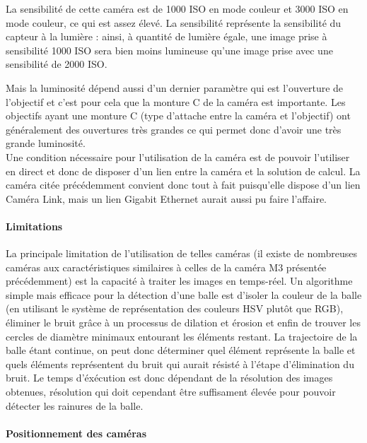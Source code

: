 La sensibilité de cette caméra est de 1000 ISO en mode couleur et 3000 ISO en mode couleur, ce qui est assez élevé. La sensibilité représente la sensibilité du capteur à la lumière : ainsi, à quantité de lumière égale, une image prise à sensibilité 1000 ISO sera bien moins lumineuse qu'une image prise avec une sensibilité de 2000 ISO. 

Mais la luminosité dépend aussi d'un dernier paramètre qui est l'ouverture de l'objectif et c'est pour cela que la monture C de la caméra est importante. Les objectifs ayant une monture C (type d'attache entre la caméra et l'objectif) ont généralement des ouvertures très grandes ce qui permet donc d'avoir une très grande luminosité. \\


Une condition nécessaire pour l'utilisation de la caméra est de pouvoir l'utiliser en direct et donc de disposer d'un lien entre la caméra et la solution de calcul. La caméra citée précédemment convient donc tout à fait puisqu'elle dispose d'un lien Caméra Link, mais un lien Gigabit Ethernet aurait aussi pu faire l'affaire.

\paragraph{Limitations\\}

La principale limitation de l'utilisation de telles caméras (il existe de nombreuses caméras aux caractéristiques similaires à celles de la caméra M3 présentée précédemment) est la capacité à traiter les images en temps-réel. Un algorithme simple mais efficace pour la détection d'une balle est d'isoler la couleur de la balle (en utilisant le système de représentation des couleurs HSV plutôt que RGB), éliminer le bruit grâce à un processus de dilation et érosion et enfin de trouver les cercles de diamètre minimaux entourant les éléments restant. La trajectoire de la balle étant continue, on peut donc déterminer quel élément représente la balle et quels éléments représentent du bruit qui aurait résisté à l'étape d'élimination du bruit. Le temps d'éxécution est donc dépendant de la résolution des images obtenues, résolution qui doit cependant être suffisament élevée pour pouvoir détecter les rainures de la balle. 


\paragraph{Positionnement des caméras\\}

